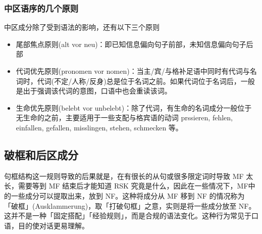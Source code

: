 \subsubsection{中区语序的几个原则}
中区成分除了受到语法的影响，还有以下三个原则
\begin{itemize}
    \item 尾部焦点原则(alt vor neu)：即已知信息偏向句子前部，未知信息偏向句子后部



    \item 代词优先原则(pronomen vor nomen)：当主/宾/与格补足语中同时有代词与名词时，代词(不定/人称/反身)总是位于名词之前。如果代词位于名词后，一般是出于强调该代词的意图，口语中也会重读该词。



    \item 生命优先原则(belebt vor unbelebt)：除了代词，有生命的名词成分一般位于无生命的之前，主要适用于一些支配与格宾语的动词 prssieren, fehlen, einfallen, gefallen, misslingen, stehen, schmecken 等。
    

\end{itemize}

\subsection{破框和后区成分}

句框结构这一规则导致的后果就是，在有很长的从句或很多限定词时导致 MF 太长，需要等到 MF 结束后才能知道 RSK 究竟是什么，因此在一些情况下，MF中的一些成分可以提取出来，放到 NF。这种将成分从 MF 移到 NF 的情况称为「破框」(Ausklammerung)，取「打破句框」之意，实则是将一些成分放至 NF。这并不是一种「固定搭配」「经验规则」，而是合规的语法变化。这种行为常见于口语，目的使对话更易理解。

